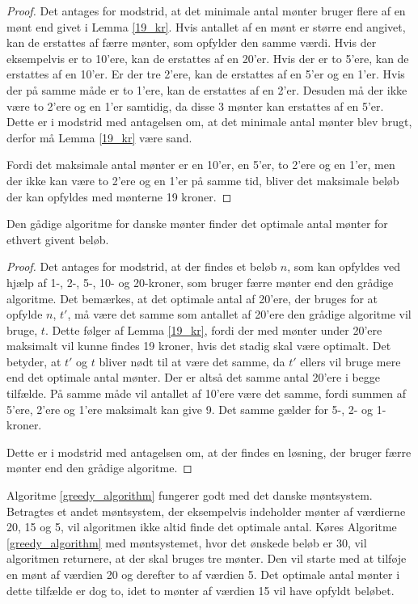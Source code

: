 \begin{proof}
\label{19_kr_bevis}
Det antages for modstrid, at det minimale antal mønter bruger flere af en mønt end givet i Lemma \ref{19_kr}.
Hvis antallet af en mønt er større end angivet, kan de erstattes af færre mønter, som opfylder den samme værdi. 
Hvis der eksempelvis er to 10'ere, kan de erstattes af en 20'er. 
Hvis der er to 5'ere, kan de erstattes af en 10'er. 
Er der tre 2'ere, kan de erstattes af en 5'er og en 1'er. 
Hvis der på samme måde er to 1'ere, kan de erstattes af en 2'er.
Desuden må der ikke være to 2'ere og en 1'er samtidig, da disse 3 mønter kan erstattes af en 5'er. 
Dette er i modstrid med antagelsen om, at det minimale antal mønter blev brugt, derfor må Lemma \ref{19_kr} være sand. 

Fordi det maksimale antal mønter er en 10'er, en 5'er, to 2'ere og en 1'er, men der ikke kan være to 2'ere og en 1'er på samme tid, bliver det maksimale beløb der kan opfyldes med mønterne 19 kroner. 
\end{proof}

\begin{thm}
\label{gradig_satning}
Den gådige algoritme for danske mønter finder det optimale antal mønter for ethvert givent beløb.
\end{thm}

\begin{proof}
\label{gradig_bevis}
Det antages for modstrid, at der findes et beløb $n$, som kan opfyldes ved hjælp af 1-, 2-, 5-, 10- og 20-kroner, som bruger færre mønter end den grådige algoritme. 
Det bemærkes, at det optimale antal af 20'ere, der bruges for at opfylde $n$, $t'$, må være det samme som antallet af 20'ere den grådige algoritme vil bruge, $t$. 
Dette følger af Lemma \ref{19_kr}, fordi der med mønter under 20'ere maksimalt vil kunne findes 19 kroner, hvis det stadig skal være optimalt. 
Det betyder, at $t'$ og $t$ bliver nødt til at være det samme, da $t'$ ellers vil bruge mere end det optimale antal mønter. 
Der er altså det samme antal 20'ere i begge tilfælde.
På samme måde vil antallet af 10'ere være det samme, fordi summen af 5'ere, 2'ere og 1'ere maksimalt kan give 9.
Det samme gælder for 5-, 2- og 1-kroner.

Dette er i modstrid med antagelsen om, at der findes en løsning, der bruger færre mønter end den grådige algoritme.
\end{proof}

Algoritme \ref{greedy_algorithm} fungerer godt med det danske møntsystem. 
Betragtes et andet møntsystem, der eksempelvis indeholder mønter af værdierne 20, 15 og 5, vil algoritmen ikke altid finde det optimale antal. 
Køres Algoritme \ref{greedy_algorithm} med møntsystemet, hvor det ønskede beløb er 30, vil algoritmen returnere, at der skal bruges tre mønter. 
Den vil starte med at tilføje en mønt af værdien 20 og derefter to af værdien 5.
Det optimale antal mønter i dette tilfælde er dog to, idet to mønter af værdien 15 vil have opfyldt beløbet.



